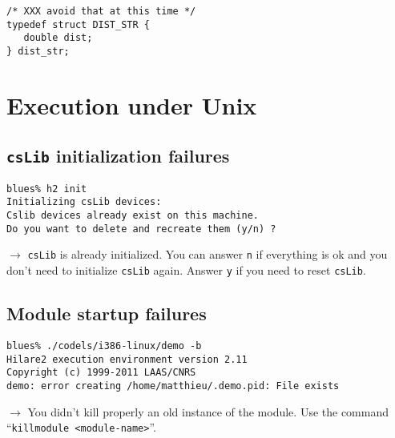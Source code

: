 \begin{center}\begin{cartouche}\small\begin{verbatim}
/* XXX avoid that at this time */
typedef struct DIST_STR {
   double dist;
} dist_str;
\end{verbatim}\end{cartouche}\end{center}


\section{Execution under Unix}

\subsection{\texttt{csLib} initialization failures}

\begin{center}\begin{cartouche}\small\begin{verbatim}
blues% h2 init
Initializing csLib devices: 
Cslib devices already exist on this machine.
Do you want to delete and recreate them (y/n) ? 
\end{verbatim}\end{cartouche}\end{center}

$\rightarrow$ \texttt{csLib} is already initialized.  You can answer \texttt{n}
if  everything is  ok  and  you  don't   need to initialize  \texttt{csLib}
again. Answer \texttt{y} if you need to reset \texttt{csLib}.


\subsection{Module startup failures}

\begin{center}\begin{cartouche}\small\begin{verbatim}
blues% ./codels/i386-linux/demo -b
Hilare2 execution environment version 2.11
Copyright (c) 1999-2011 LAAS/CNRS
demo: error creating /home/matthieu/.demo.pid: File exists
\end{verbatim}\end{cartouche}\end{center}

$\rightarrow$ You didn't kill properly an old instance of the module. Use
the command ``\texttt{killmodule <module-name>}''.



